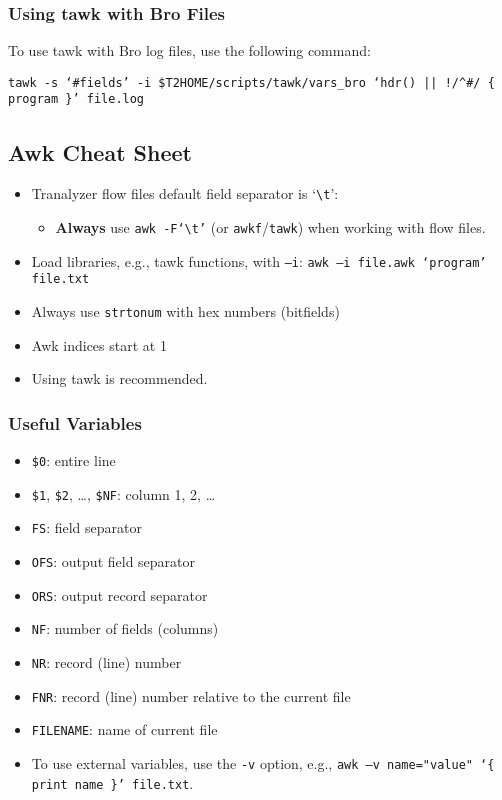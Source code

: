 \documentclass[documentation]{subfiles}
\begin{document}
\subsubsection{Using tawk with Bro Files}
To use tawk with Bro log files, use the following command:
\begin{center}
    {\tt tawk -s `\#fields' -i \$T2HOME/scripts/tawk/vars\_bro `hdr() || !/\textasciicircum\#/ \{ program \}' file.log}
\end{center}

\subsection{Awk Cheat Sheet}
\begin{itemize}
    \item Tranalyzer flow files default field separator is `{\tt \textbackslash{}t}':
    \begin{itemize}
        \item {\bf Always} use {\tt awk -F`\textbackslash{}t'} (or {\tt awkf}/{\tt tawk}) when working with flow files.
    \end{itemize}
\item Load libraries, e.g., tawk functions, with {\tt --i}: {\tt awk --i file.awk `program' file.txt}
    \item Always use {\tt strtonum} with hex numbers (bitfields)
    \item Awk indices start at 1
    \item Using tawk is recommended.
\end{itemize}

\subsubsection{Useful Variables}
\begin{itemize}
    \item {\tt \$0}: entire line
    \item {\tt \$1}, {\tt \$2}, \ldots, {\tt \$NF}: column 1, 2, \ldots
    \item {\tt FS}: field separator
    \item {\tt OFS}: output field separator
    \item {\tt ORS}: output record separator
    \item {\tt NF}: number of fields (columns)
    \item {\tt NR}: record (line) number
    \item {\tt FNR}: record (line) number relative to the current file
    \item {\tt FILENAME}: name of current file
    \item To use external variables, use the {\tt -v} option, e.g., {\tt awk --v name="value" `\{ print name \}' file.txt}.
\end{itemize}
\end{document}
